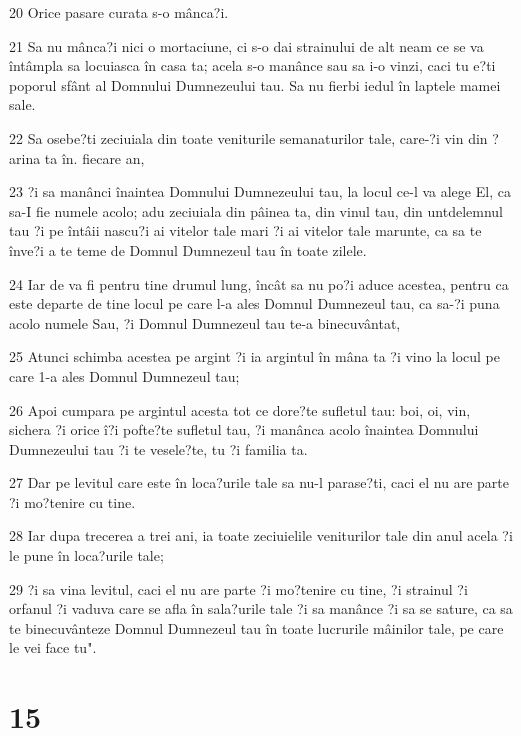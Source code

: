 \par 20 Orice pasare curata s-o mânca?i.
\par 21 Sa nu mânca?i nici o mortaciune, ci s-o dai strainului de alt neam ce se va întâmpla sa locuiasca în casa ta; acela s-o manânce sau sa i-o vinzi, caci tu e?ti poporul sfânt al Domnului Dumnezeului tau. Sa nu fierbi iedul în laptele mamei sale.
\par 22 Sa osebe?ti zeciuiala din toate veniturile semanaturilor tale, care-?i vin din ?arina ta în. fiecare an,
\par 23 ?i sa manânci înaintea Domnului Dumnezeului tau, la locul ce-l va alege El, ca sa-I fie numele acolo; adu zeciuiala din pâinea ta, din vinul tau, din untdelemnul tau ?i pe întâii nascu?i ai vitelor tale mari ?i ai vitelor tale marunte, ca sa te înve?i a te teme de Domnul Dumnezeul tau în toate zilele.
\par 24 Iar de va fi pentru tine drumul lung, încât sa nu po?i aduce acestea, pentru ca este departe de tine locul pe care l-a ales Domnul Dumnezeul tau, ca sa-?i puna acolo numele Sau, ?i Domnul Dumnezeul tau te-a binecuvântat,
\par 25 Atunci schimba acestea pe argint ?i ia argintul în mâna ta ?i vino la locul pe care 1-a ales Domnul Dumnezeul tau;
\par 26 Apoi cumpara pe argintul acesta tot ce dore?te sufletul tau: boi, oi, vin, sichera ?i orice î?i pofte?te sufletul tau, ?i manânca acolo înaintea Domnului Dumnezeului tau ?i te vesele?te, tu ?i familia ta.
\par 27 Dar pe levitul care este în loca?urile tale sa nu-l parase?ti, caci el nu are parte ?i mo?tenire cu tine.
\par 28 Iar dupa trecerea a trei ani, ia toate zeciuielile veniturilor tale din anul acela ?i le pune în loca?urile tale;
\par 29 ?i sa vina levitul, caci el nu are parte ?i mo?tenire cu tine, ?i strainul ?i orfanul ?i vaduva care se afla în sala?urile tale ?i sa manânce ?i sa se sature, ca sa te binecuvânteze Domnul Dumnezeul tau în toate lucrurile mâinilor tale, pe care le vei face tu".

\chapter{15}

